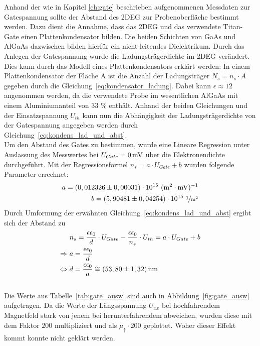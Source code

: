 Anhand der wie in Kapitel \ref{ch:gate} beschrieben aufgenommenen Messdaten zur Gatespannung sollte der Abstand des 2DEG zur Probenoberfläche bestimmt werden. Dazu dient die Annahme, dass das 2DEG und das verwendete Titan-Gate einen Plattenkondensator bilden. Die beiden Schichten von GaAs und AlGaAs dazwischen bilden hierfür ein nicht-leitendes Dielektrikum. 
Durch das Anlegen der Gatespannung wurde die Ladungsträgerdichte im 2DEG verändert.  Dies kann durch das Modell eines Plattenkondensators erklärt werden: In einem Plattenkondensator der Fläche A ist die Anzahl der Ladungsträger $N_s=n_s \cdot A$ gegeben durch die Gleichung~\eqref{eq:kondensator_ladung}. Dabei kann $\epsilon \approx 12$ angenommen werden, da die verwendete Probe im wesentlichen AlGaAs mit einem Aluminiumanteil von 33 \% enthält. Anhand der beiden Gleichungen und der Einsatzspannung $U_{th}$ kann nun die Abhängigkeit der Ladungsträgerdichte von der Gatespannung angegeben werden durch Gleichung~\eqref{eq:kondens_lad_und_abst}.\\

Um den Abstand des Gates zu bestimmen, wurde eine Lineare Regression unter Auslassung des Messwertes bei $U_{Gate}=\unit[0]{mV}$ über die Elektronendichte durchgeführt. Mit der Regressionsformel $n_s=a\cdot U_{Gate} + b$ wurden folgende Parameter errechnet:
\begin{align}
a = ( 0,012326 \pm 0,00031)\cdot 10^{15} ~ \unit{(m^2 \cdot mV)^{-1}}\\
b=( 5,90481 \pm 0,04254 )\cdot 10^{15} ~ \unitfrac{1}{m^2}
\end{align}
Durch Umformung der erwähnten Gleichung~\eqref{eq:kondens_lad_und_abst} ergibt sich der Abstand zu
\begin{align}
& n_s=\frac{\epsilon \epsilon_0}{d}\cdot U_{Gate} - \frac{\epsilon \epsilon_0}{n_s} \cdot U_{th}= a \cdot U_{Gate} + b \\
\Rightarrow~ & a=\frac{\epsilon \epsilon_0}{d}\\
\Leftrightarrow~ & d=\frac{\epsilon \epsilon_0}{a} \cong \unit[(53,80 \pm 1,32)]{nm}
\end{align}\\

Die Werte aus Tabelle~\ref{tab:gate_ausw} sind auch in Abbildung~\ref{fig:gate_ausw} aufgetragen. Da die Werte der Längsspannung $U_{xx}$ bei hochfahrendem Magnetfeld stark von jenem bei herunterfahrendem abweichen, wurden diese mit dem Faktor $200$ multipliziert und als $\mu_{\uparrow}\cdot 200$ geplottet. Woher dieser Effekt kommt konnte nicht geklärt werden.

